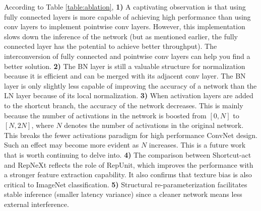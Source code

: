 \documentclass[preprint,12pt]{elsarticle}
\begin{document}
According to Table \ref{table:ablation}, \textbf{1)} A captivating observation is that using fully connected layers is more capable of achieving high performance than using conv layers to implement pointwise conv layers. However, this implementation slows down the inference of the network (but as mentioned earlier, the fully connected layer has the potential to achieve better throughput). The interconversion of fully connected and pointwise conv layers can help you find a better solution. \textbf{2)} The BN layer is still a valuable structure for normalization because it is efficient and can be merged with its adjacent conv layer. The BN layer is only slightly less capable of improving the accuracy of a network than the LN layer because of its local normalization. \textbf{3)} When activation layers are added to the shortcut branch, the accuracy of the network decreases. This is mainly because the number of activations in the network is boosted from $[0, N]$ to $[N,2N]$, where $N$ denotes the number of activations in the original network. This breaks the fewer activations paradigm for high performance ConvNet design. Such an effect may become more evident as $N$ increases. This is a future work that is worth continuing to delve into. \textbf{4)} The comparison between Shortcut-act and RepNeXt reflects the role of RepUnit, which improves the performance with a stronger feature extraction capability. It also confirms that texture bias is also critical to ImageNet classification. \textbf{5)} Structural re-parameterization facilitates stable inference (smaller latency variance) since a cleaner network means less external interference.
\end{document}
